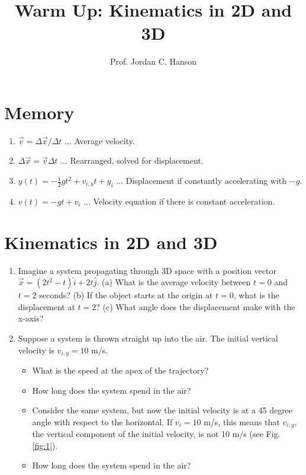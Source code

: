 \documentclass{article}
\begin{document}
\title{Warm Up: Kinematics in 2D and 3D}
\author{Prof. Jordan C. Hanson}

\maketitle

\section{Memory}

\begin{enumerate}
\item $\vec{v} = \Delta \vec{x}/\Delta t$ ... Average velocity.
\item $\Delta \vec{x} = \vec{v} \Delta t$ ... Rearranged, solved for displacement.
\item $y(t) = -\frac{1}{2}g t^2 + v_{i,y}t + y_i$ ... Displacement if constantly accelerating with $-g$.
\item $v(t) = -g t + v_{i}$ ... Velocity equation if there is constant acceleration.
\end{enumerate}

\section{Kinematics in 2D and 3D}

\begin{enumerate}
\item Imagine a system propagating through 3D space with a position vector $\vec{x} = (2t^2-t)\hat{i} + 2t\hat{j}$.  (a) What is the average velocity between $t = 0$ and $t = 2$ seconds? (b) If the object starts at the origin at $t = 0$, what is the displacement at $t = 2$?  (c) What angle does the displacement make with the x-axis? \\ \vspace{1cm}
\item Suppose a system is thrown straight up into the air.  The initial vertical velocity is $v_{i,y} = 10$ m/s.
\begin{itemize}
\item What is the speed at the apex of the trajectory? \\ \vspace{1cm}
\item How long does the system spend in the air? \\ \vspace{1cm}
\item Consider the same system, but now the initial velocity is at a 45 degree angle with respect to the horizontal.  If $v_i = 10$ m/s, this means that $v_{i,y}$, the vertical component of the initial velocity, is not 10 m/s (see Fig. \ref{fig:1}).
\item How long does the system spend in the air?
\end{itemize}
\end{enumerate}
\end{document}

